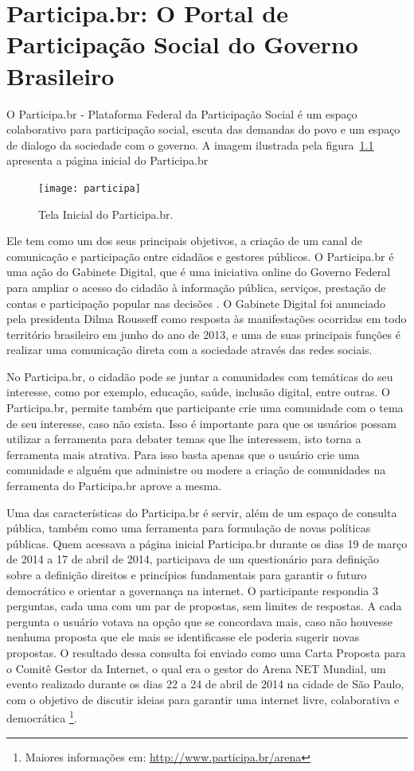  \chapter{Participa.br: O Portal de Participação Social do Governo Brasileiro}
\label{cap:participabr}

O Participa.br - Plataforma Federal da Participação Social é um espaço colaborativo  para participação social, escuta das demandas do povo e um espaço de dialogo da sociedade com o governo. A imagem ilustrada pela figura~\ref{fig:participabr} apresenta a página inicial do Participa.br

\graphicspath{{figuras/}}
\begin{figure}[H]
\centering
\texttt{[image: participa]}
\caption{Tela Inicial do Participa.br.}
\label{fig:participabr}
\end{figure}

Ele tem como um dos seus principais objetivos, a criação de um canal de comunicação e participação entre cidadãos e gestores públicos. O Participa.br é uma ação do Gabinete Digital, que é uma iniciativa online do Governo Federal para ampliar o acesso do cidadão à informação pública, serviços, prestação de contas e participação popular nas decisões \cite{gabinete2013brasil}. O Gabinete Digital foi anunciado pela presidenta Dilma Rousseff como resposta às manifestações ocorridas em todo território brasileiro em junho do ano de 2013, e uma de suas principais funções é realizar uma comunicação direta com a sociedade através das redes sociais.

No Participa.br, o cidadão pode se juntar a comunidades com temáticas do seu interesse, como por exemplo, educação, saúde, inclusão digital, entre outras. O Participa.br, permite também que participante crie uma comunidade com o tema de seu interesse, caso não exista. Isso é importante para que os usuários possam utilizar a ferramenta para debater temas que lhe interessem, isto torna a ferramenta mais atrativa. Para isso basta apenas que o usuário crie uma comunidade e alguém que administre ou modere a criação de comunidades na ferramenta do Participa.br aprove a mesma.

Uma das características do Participa.br é servir, além de um espaço de consulta pública, também como uma ferramenta para formulação de novas políticas públicas. Quem acessava a página inicial Participa.br durante os dias 19 de março de 2014 a 17 de abril de 2014, participava de um questionário para definição sobre a definição direitos e princípios fundamentais para garantir o futuro democrático e orientar a governança na internet. O participante respondia 3 perguntas, cada uma com um par de propostas, sem limites de respostas. A cada pergunta o usuário votava na opção que se concordava mais, caso não houvesse nenhuma proposta que ele mais se identificasse ele poderia sugerir novas propostas. O resultado dessa consulta foi enviado como uma Carta Proposta para o Comitê Gestor da Internet, o qual era o gestor do Arena NET Mundial, um evento realizado durante os dias 22 a 24 de abril de 2014 na cidade de São Paulo, com o objetivo de discutir ideias para garantir uma internet livre, colaborativa e democrática \footnote{Maiores informações em: \url{http://www.participa.br/arena}}.


